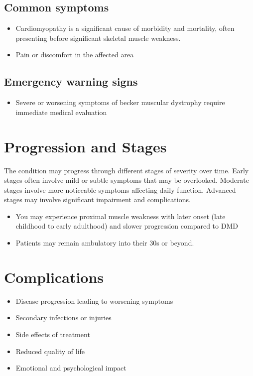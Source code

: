 \subsection{Common symptoms}
\begin{itemize}[noitemsep]
  \item Cardiomyopathy is a significant cause of morbidity and mortality, often presenting before significant skeletal muscle weakness.

  \item Pain or discomfort in the affected area
  \end{itemize}

\subsection{Emergency warning signs}
\begin{itemize}[noitemsep]
  \item Severe or worsening symptoms of becker muscular dystrophy require immediate medical evaluation
\end{itemize}
\section{Progression and Stages}
The condition may progress through different stages of severity over time. Early stages often involve mild or subtle symptoms that may be overlooked. Moderate stages involve more noticeable symptoms affecting daily function. Advanced stages may involve significant impairment and complications.

\begin{itemize}[noitemsep]
  \item You may experience proximal muscle weakness with later onset (late childhood to early adulthood) and slower progression compared to DMD
  \item Patients may remain ambulatory into their 30s or beyond.
\end{itemize}
\section{Complications}
\begin{itemize}[noitemsep]
  \item Disease progression leading to worsening symptoms
  \item Secondary infections or injuries
  \item Side effects of treatment
  \item Reduced quality of life
  \item Emotional and psychological impact
\end{itemize}
